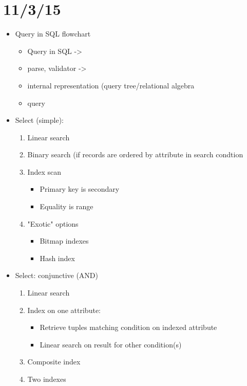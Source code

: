 \documentclass[12pt]{article}
\begin{document}
	\section{11/3/15}
		\begin{itemize}
			\item
				Query in SQL flowchart
			\begin{itemize}
				\item
					Query in SQL ->
				\item
					parse, validator ->
				\item
					internal representation (query tree/relational algebra
				\item
					query
			\end{itemize}
			\item
				Select (simple):
				\begin{enumerate}
					\item
						Linear search
					\item
						Binary search (if records are ordered by attribute in search condtion
					\item
						Index scan
						\begin{itemize}
							\item
								Primary key is secondary
							\item
								Equality is range
						\end{itemize}
					\item
						"Exotic" options
						\begin{itemize}
							\item
								Bitmap indexes
							\item
								Hash index
						\end{itemize}
				\end{enumerate}
			\item
				Select: conjunctive (AND)
				\begin{enumerate}
					\item
						Linear search
					\item
						Index on one attribute:
						\begin{itemize}
							\item
								Retrieve tuples matching condition on indexed attribute
							\item
								Linear search on result for other condition(s)
						\end{itemize}
					\item
						Composite index
					\item
						Two indexes

\end{enumerate}
\end{itemize}
\end{document}
